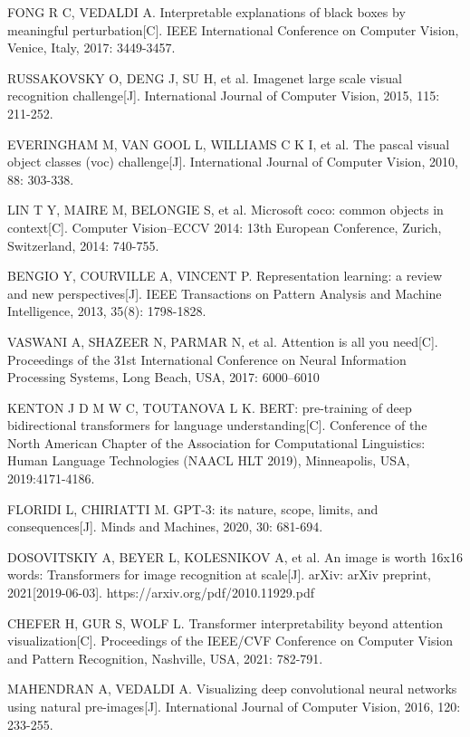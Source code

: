 \begin{thebibliography}{200}
FONG R C, VEDALDI A. Interpretable explanations of black boxes by meaningful perturbation[C]. IEEE International Conference on Computer Vision, Venice, Italy, 2017: 3449-3457.

RUSSAKOVSKY O, DENG J, SU H, et al. Imagenet large scale visual recognition challenge[J]. International Journal of Computer Vision, 2015, 115: 211-252.

EVERINGHAM M, VAN GOOL L, WILLIAMS C K I, et al. The pascal visual object classes (voc) challenge[J]. International Journal of Computer Vision, 2010, 88: 303-338.

LIN T Y, MAIRE M, BELONGIE S, et al. Microsoft coco: common objects in context[C]. Computer Vision–ECCV 2014: 13th European Conference, Zurich, Switzerland, 2014: 740-755.

BENGIO Y, COURVILLE A, VINCENT P. Representation learning: a review and new perspectives[J]. IEEE Transactions on Pattern Analysis and Machine Intelligence, 2013, 35(8): 1798-1828.

VASWANI A, SHAZEER N, PARMAR N, et al. Attention is all you need[C]. Proceedings of the 31st International Conference on Neural Information Processing Systems, Long Beach, USA, 2017: 6000–6010

KENTON J D M W C, TOUTANOVA L K. BERT: pre-training of deep bidirectional transformers for language understanding[C]. Conference of the North American Chapter of the Association for Computational Linguistics: Human Language Technologies (NAACL HLT 2019), Minneapolis, USA, 2019:4171-4186.

FLORIDI L, CHIRIATTI M. GPT-3: its nature, scope, limits, and consequences[J]. Minds and Machines, 2020, 30: 681-694.

DOSOVITSKIY A, BEYER L, KOLESNIKOV A, et al. An image is worth 16x16 words: Transformers for image recognition at scale[J]. arXiv: arXiv preprint, 2021[2019-06-03]. https://arxiv.org/pdf/2010.11929.pdf

CHEFER H, GUR S, WOLF L. Transformer interpretability beyond attention visualization[C]. Proceedings of the IEEE/CVF Conference on Computer Vision and Pattern Recognition, Nashville, USA, 2021: 782-791.

MAHENDRAN A, VEDALDI A. Visualizing deep convolutional neural networks using natural pre-images[J]. International Journal of Computer Vision, 2016, 120: 233-255.


\end{thebibliography}
